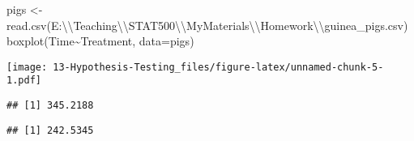 \documentclass[
]{book}
\newenvironment{Shaded}{\begin{snugshade}}{\end{snugshade}}
\newcommand{\AttributeTok}[1]{\textcolor[rgb]{0.77,0.63,0.00}{#1}}
\newcommand{\DecValTok}[1]{\textcolor[rgb]{0.00,0.00,0.81}{#1}}
\newcommand{\FunctionTok}[1]{\textcolor[rgb]{0.00,0.00,0.00}{#1}}
\newcommand{\NormalTok}[1]{#1}
\newcommand{\OtherTok}[1]{\textcolor[rgb]{0.56,0.35,0.01}{#1}}
\newcommand{\SpecialCharTok}[1]{\textcolor[rgb]{0.00,0.00,0.00}{#1}}
\newcommand{\StringTok}[1]{\textcolor[rgb]{0.31,0.60,0.02}{#1}}
\begin{document}
\begin{Shaded}
\begin{Highlighting}[]
\NormalTok{pigs }\OtherTok{\textless{}{-}} 
\FunctionTok{read.csv}\NormalTok{(}\StringTok{\textquotesingle{}E:}\SpecialCharTok{\textbackslash{}\textbackslash{}}\StringTok{Teaching}\SpecialCharTok{\textbackslash{}\textbackslash{}}\StringTok{STAT500}\SpecialCharTok{\textbackslash{}\textbackslash{}}\StringTok{MyMaterials}\SpecialCharTok{\textbackslash{}\textbackslash{}}\StringTok{Homework}\SpecialCharTok{\textbackslash{}\textbackslash{}}\StringTok{guinea\_pigs.csv\textquotesingle{}}\NormalTok{)}
\FunctionTok{boxplot}\NormalTok{(Time}\SpecialCharTok{\textasciitilde{}}\NormalTok{Treatment, }\AttributeTok{data=}\NormalTok{pigs)}
\end{Highlighting}
\end{Shaded}

\texttt{[image: 13-Hypothesis-Testing\_files/figure-latex/unnamed-chunk-5-1.pdf]}

\begin{Shaded}
\end{Shaded}

\begin{verbatim}
## [1] 345.2188
\end{verbatim}

\begin{Shaded}
\end{Shaded}

\begin{verbatim}
## [1] 242.5345
\end{verbatim}

\begin{Shaded}
\end{Shaded}
\end{document}
